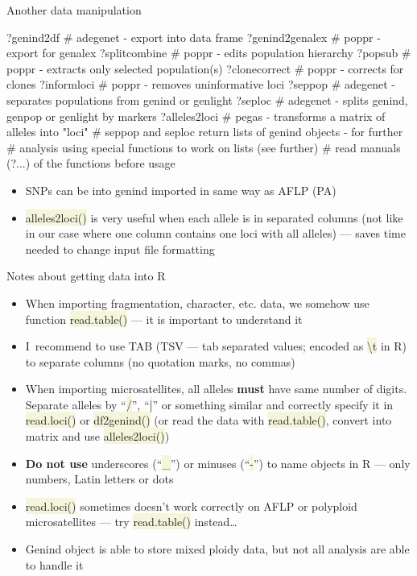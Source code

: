 \documentclass[compress, xelatex, 11pt, xcolor=svgnames, aspectratio=169,
	hyperref={
		bookmarks=true,
		unicode=true,
		colorlinks=true,
		pdftitle={Molecular data in R},
		plainpages=false,
		pdfauthor={Vojtech Zeisek},
		pdfsubject={Course about phylogeny and evolution in R},
		pdfcreator={XeLaTeX},
		pdfkeywords={R, evolution, phylogeny, molecular data},
		linkcolor=Crimson, %
		anchorcolor=Magenta, %
		citecolor=Magenta, %
		filecolor=Magenta, %
		menucolor=Magenta, %
		urlcolor=DodgerBlue, %
		},
	url={hyphens, lowtilde} %
	]{beamer}
\renewcommand{\texttt}[1]{\colorbox{Beige}{{\ttfamily #1}}}
\begin{document}
\begin{frame}[fragile]{Another data manipulation}
	\begin{spluscode}
    ?genind2df # adegenet - export into data frame
    ?genind2genalex # poppr - export for genalex
    ?splitcombine # poppr - edits population hierarchy
    ?popsub # poppr - extracts only selected population(s)
    ?clonecorrect # poppr - corrects for clones
    ?informloci # poppr - removes uninformative loci
    ?seppop # adegenet - separates populations from genind or genlight
    ?seploc # adegenet - splits genind, genpop or genlight by markers
    ?alleles2loci # pegas - transforms a matrix of alleles into "loci"
    # seppop and seploc return lists of genind objects - for further
    # analysis using special functions to work on lists (see further)
    # read manuals (?...) of the functions before usage
	\end{spluscode}
	\begin{itemize}
		\item SNPs can be into genind imported in same way as AFLP (PA)
		\item \texttt{alleles2loci()} is very useful when each allele is in separated columns (not like in our case where one column contains one loci with all alleles) --- saves time needed to change input file formatting
	\end{itemize}
\end{frame}

\begin{frame}{Notes about getting data into R}
	\begin{itemize}
		\item When importing fragmentation, character, etc. data, we somehow use function \texttt{read.table()} --- it is important to understand it
		\item I~recommend to use TAB (TSV --- tab separated values; encoded as \texttt{\textbackslash t} in R) to separate columns (no quotation marks, no commas)
		\item When importing microsatellites, all alleles \textbf{must} have same number of digits. Separate alleles by \enquote{\texttt{/}}, \enquote{\texttt{|}} or something similar and correctly specify it in \texttt{read.loci()} or \texttt{df2genind()} (or read the data with \texttt{read.table()}, convert into matrix and use \texttt{alleles2loci()})
		\item \textbf{Do not use} underscores (\enquote{\texttt{\_}}) or minuses (\enquote{\texttt{-}}) to name objects in R --- only numbers, Latin letters or dots
		\item \texttt{read.loci()} sometimes doesn't work correctly on AFLP or polyploid microsatellites --- try \texttt{read.table()} instead\ldots
		\item Genind object is able to store mixed ploidy data, but not all analysis are able to handle it
	\end{itemize}
\end{frame}
\end{document}
